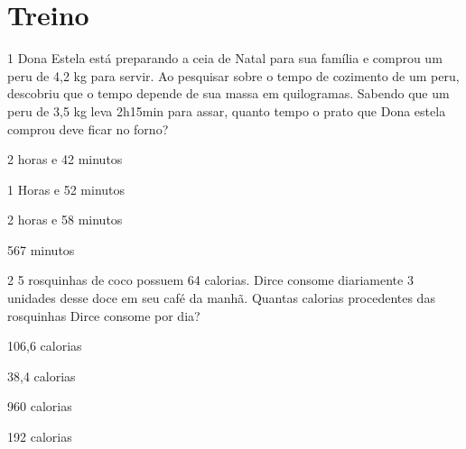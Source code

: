 \section{Treino}

\num{1} Dona Estela está preparando a ceia de Natal para sua família e
comprou um peru de 4,2 kg para servir. Ao pesquisar sobre o tempo de
cozimento de um peru, descobriu que o tempo depende de sua massa em
quilogramas. Sabendo que um peru de 3,5 kg leva 2h15min para assar,
quanto tempo o prato que Dona estela comprou deve ficar no forno?
\item 2 horas e 42 minutos
\item 1 Horas e 52 minutos
\item 2 horas e 58 minutos
\item 567 minutos










\num{2} 5 rosquinhas de coco possuem 64 calorias. Dirce consome diariamente 3
unidades desse doce em seu café da manhã. Quantas calorias procedentes
das rosquinhas Dirce consome por dia?
\item 106,6 calorias
\item 38,4 calorias
\item 960 calorias
\item 192 calorias


